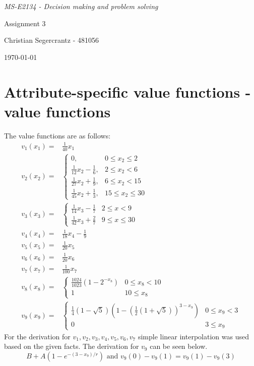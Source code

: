 \documentclass{article}
\begin{document}
	\textit{MS-E2134 - Decision making and problem solving}
	\vfill
	{\centering \Huge Assignment 3 \par}
	\vfill
	Christian Segercrantz - 481056 \\
	\par \today
	\pagebreak
	\tableofcontents
	\pagebreak
\section{Attribute-specific value functions - value functions}
The value functions are as follows:
\begin{align}
	v_1(x_1) =& \frac{1}{40}x_1 \\
	v_2(x_2) =& 
		\begin{cases}
		 0,& 0 \leq x_2 \leq 2 \\
		 \frac{1}{12}x_2 -\frac{1}{6},& 2 \leq x_2 < 6 \\
		 \frac{1}{27}x_2 +\frac{1}{9},& 6 \leq x_2 < 15 \\
		 \frac{1}{45}x_2 +\frac{1}{3},& 15 \leq x_2 \leq 30
		\end{cases}\\
	v_3(x_3) =&
		\begin{cases}
			\frac{1}{14}x_3 - \frac{1}{7} & 2 \leq x <9\\
			\frac{1}{42}x_3 + \frac{2}{7} & 9 \leq x \leq 30
		\end{cases} \\
	v_4(x_4) =& \frac{1}{18}x_4 - \frac{1}{9}\\ 
	v_5(x_5) =& \frac{1}{20}x_5\\
	v_6(x_6) =& \frac{1}{20}x_6\\
	v_7(x_7) =& \frac{1}{100}x_7\\
	v_8(x_8) =& 
		\begin{cases}
			\frac{1024}{1023}\left(1-2^{-x_8}\right) & 0 \leq x_8 < 10 \\
			1 &  10 \leq x_8
		\end{cases} \\
	v_9(x_9) =&
		\begin{cases}
			 \frac{1}{4}(1-\sqrt{5})\left(1-\left(\frac{1}{2}\left(1+\sqrt{5}\right)\right)^{3-x_9}\right) & 0 \leq x_9 < 3 \\
			 0 & 3 \leq x_9
		\end{cases}
\end{align}
For the derivation for $v_1, v_2, v_3, v_4, v_5, v_6, v_7$ simple linear interpolation was used based on the given facts. The derivation for $v_9$ can be seen below.
\begin{equation}
B+A(1-e^{-(3-x_9)/r}) \text{ and } v_9(0)-v_9(1) = v_9(1) - v_9(3)
\end{equation}
\end{document}

